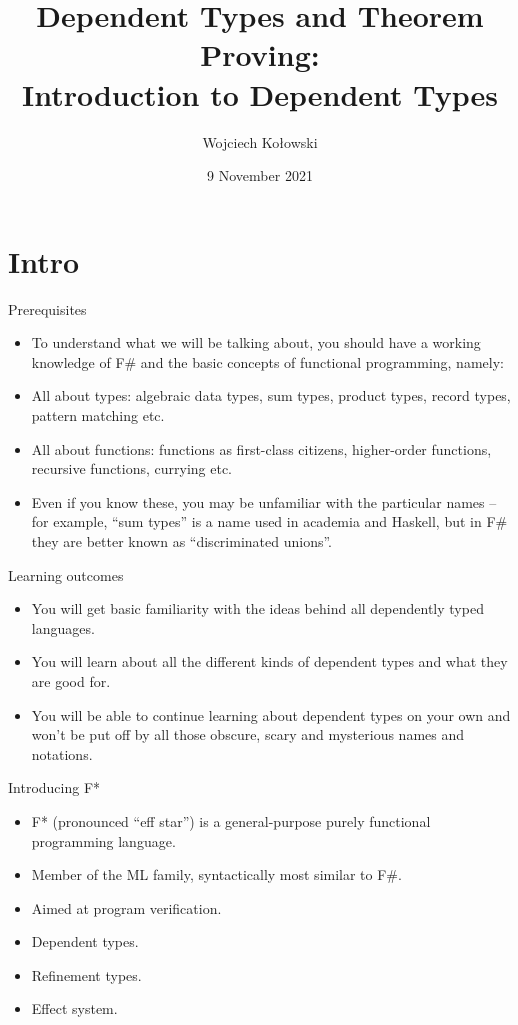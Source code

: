 \documentclass{beamer}
\title{Dependent Types and Theorem Proving: \\Introduction to Dependent Types}
\author{Wojciech Kołowski}
\date{9 November 2021}
\begin{document}
\frame{\titlepage}

\section{Intro}

\begin{frame}{Prerequisites}
\begin{itemize}
	\item To understand what we will be talking about, you should have a working knowledge of F\# and the basic concepts of functional programming, namely:
	\item All about types: algebraic data types, sum types, product types, record types, pattern matching etc.
	\item All about functions: functions as first-class citizens, higher-order functions, recursive functions, currying etc.
	\item Even if you know these, you may be unfamiliar with the particular names -- for example, ``sum types'' is a name used in academia and Haskell, but in F\# they are better known as ``discriminated unions''.
\end{itemize}
\end{frame}

\begin{frame}{Learning outcomes}
\begin{itemize}
	\item You will get basic familiarity with the ideas behind all dependently typed languages.
	\item You will learn about all the different kinds of dependent types and what they are good for.
	\item You will be able to continue learning about dependent types on your own and won't be put off by all those obscure, scary and mysterious names and notations.
\end{itemize}
\end{frame}

\frame{\tableofcontents}

\begin{frame}{Introducing F*}
\begin{itemize}
	\item F* (pronounced ``eff star'') is a general-purpose purely functional programming language.
	\item Member of the ML family, syntactically most similar to F\#.
	\item Aimed at program verification.
	\item Dependent types.
	\item Refinement types.
	\item Effect system.
\end{itemize}
\end{frame}
\end{document}
